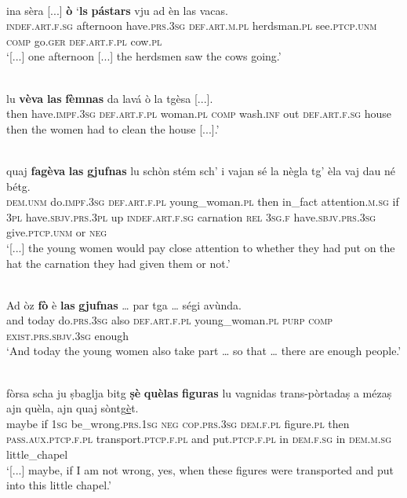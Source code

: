 \ea
\label{}
 {\citealt[28]{Büchli1966}}\\
\gll [...] ina sèra [...] \textbf{ò} `\textbf{ls} \textbf{pástars} vju ad èn las vacas.\\
{} \textsc{indef.art.f.sg} afternoon {} have.\textsc{prs.3sg} \textsc{def.art.m.pl} herdsman.\textsc{pl} see.\textsc{ptcp.unm} \textsc{comp} go.\textsc{ger} \textsc{def.art.f.pl} cow.\textsc{pl}\\
\glt `[...] one afternoon [...] the herdsmen saw the cows going.'
\z

\ea
\label{}
\\
\gll [...] lu \textbf{vèva} \textbf{las} \textbf{fèmnas} da lavá ò la tgèsa [...].   \\
{} then have.\textsc{impf.3sg} \textsc{def.art.f.pl} woman.\textsc{pl} \textsc{comp} wash.\textsc{inf} out \textsc{def.art.f.sg} house\\
\glt [...] then the women had to clean the house [...].'
\z

\ea
\label{}
\\
\gll    [...] quaj \textbf{fagèva} \textbf{las} \textbf{gjufnas} lu schòn stém sch’ i vajan sé la nègla tg’ èla vaj dau né bétg.\\
{} \textsc{dem.unm} do.\textsc{impf.3sg} \textsc{def.art.f.pl} young\_woman.\textsc{pl} then in\_fact attention.\textsc{m.sg} if \textsc{3pl}  have.\textsc{sbjv.prs.3pl} up \textsc{indef.art.f.sg} carnation \textsc{rel} \textsc{3sg.f} have.\textsc{sbjv.prs.3sg}  give.\textsc{ptcp.unm} or \textsc{neg} \\
\glt `[...] the young women would pay close attention to whether they had put on the hat the carnation they had given them or not.'
\z

\ea
\label{ex:3sg:e}
\\
\gll    Ad òz \textbf{fò} è \textbf{las} \textbf{gjufnas} … par tga … ségi avùnda.\\
and today do.\textsc{prs.3sg} also  \textsc{def.art.f.pl} young\_woman.\textsc{pl} {} \textsc{purp} \textsc{comp} {} \textsc{exist.prs.sbjv.3sg} enough\\
\glt `And today the young women also take part … so that … there are enough people.'
\z

\ea
\label{}
\\
\gll  [...] fòrsa scha ju ṣbaglja bitg \textbf{ṣè} \textbf{quèlas} \textbf{figuras} lu vagnidas trans-pòrtadaṣ a mézaṣ ajn quèla, ajn quaj sòntg\underline{è}t.\\
{} maybe if \textsc{1sg} be\_wrong.\textsc{prs.1sg} \textsc{neg} \textsc{cop.prs.3sg} \textsc{dem.f.pl} figure.\textsc{pl} then \textsc{pass.aux.ptcp.f.pl} transport.\textsc{ptcp.f.pl} and put.\textsc{ptcp.f.pl} in \textsc{dem.f.sg} in \textsc{dem.m.sg} little\_chapel\\
\glt `[...] maybe, if I am not wrong, yes, when these figures were transported and put into this little chapel.'
\z

